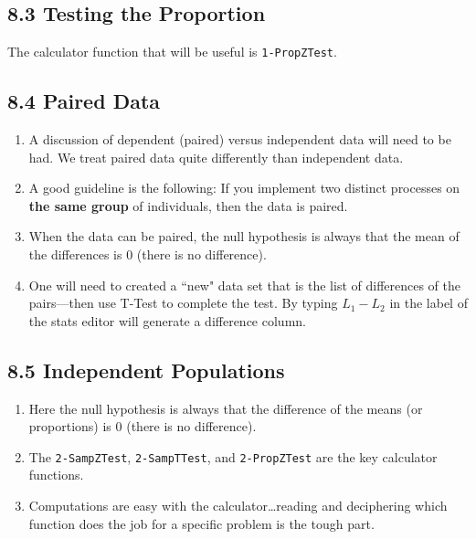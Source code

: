 \documentclass{ccg-topic}
\begin{document}
\subsection*{8.3 Testing the Proportion}

The calculator function that will be useful is \texttt{1-PropZTest}.

\subsection*{8.4 Paired Data}

\begin{enumerate}

    \item A discussion of dependent (paired) versus independent data will need to be had.  We treat paired data quite differently than independent data.
    
    \item A good guideline is the following: If you implement two distinct processes on \textbf{the same group} of individuals, then the data is paired.
    
    \item When the data can be paired, the null hypothesis is always that the mean of the differences is 0 (there is no difference).
    
    \item One will need to created a ``new" data set that is the list of differences of the pairs---then use T-Test to complete the test. By typing $L_1 - L_2$ in the label of the stats editor will generate a difference column.
    
\end{enumerate}

\subsection*{8.5 Independent Populations}

\begin{enumerate}

    \item Here the null hypothesis is always that the difference of the means (or proportions) is 0 (there is no difference).
    
    \item The \texttt{2-SampZTest}, \texttt{2-SampTTest}, and \texttt{2-PropZTest} are the key calculator functions.
    
    \item Computations are easy with the calculator\ldots reading and deciphering which function does the job for a specific problem is the tough part.

\end{enumerate}
\end{document}
